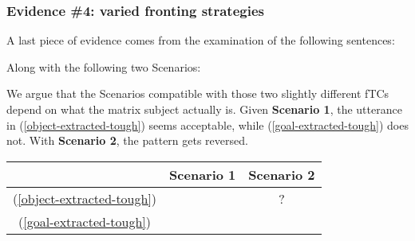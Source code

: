 \documentclass[11pt]{article}
\newcommand{\cmark}{\ding{51}}
\newcommand{\xmark}{\ding{55}}
\begin{document}
\subsubsection{Evidence \#4: varied fronting strategies}\label{ex:fronting-strategies-tough}
A last piece of evidence comes from the examination of the following sentences:
\begin{exe}
	\ex
	\begin{xlist}
		\label{object-extracted-tough}
		\label{goal-extracted-tough}
	\end{xlist}\label{double-object-tough-sc1}
\end{exe}
Along with the following two Scenarios:
\begin{center}
\end{center}
	\begin{center}
\end{center}
We argue that the Scenarios compatible with those two slightly different fTCs depend on what the matrix subject actually is. Given \textbf{Scenario 1}, the utterance in (\ref{object-extracted-tough}) seems acceptable, while (\ref{goal-extracted-tough}) does not. With \textbf{Scenario 2}, the pattern gets reversed.
\begin{table}[H]
	\centering
	\begin{tabular}{|c|c|c|}
		\hline
		& \textbf{Scenario 1} & \textbf{Scenario 2} \\ \hline
		(\ref{object-extracted-tough}) & \cmark & ? \\
		(\ref{goal-extracted-tough}) & \xmark & \cmark \\ \hline
	\end{tabular}
\end{table}
\end{document}
